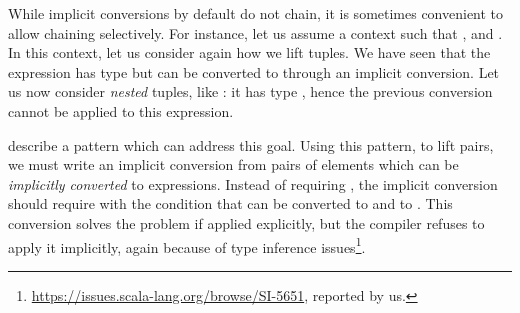 


While implicit conversions by default do not chain, it is sometimes convenient to allow chaining selectively.
For instance, let us assume a context such that ,  and .
In this context, let us consider again how we lift tuples. We have seen that the expression  has type  but can be converted to  through an implicit conversion. Let us now consider \emph{nested} tuples, like : it has type , hence the previous conversion cannot be applied to this expression.

\citet[Ch.~21]{Odersky11book} describe a pattern which can address this goal. Using this pattern, to lift pairs, we must write an implicit conversion from pairs of elements which can be \emph{implicitly converted} to expressions. Instead of requiring
, the implicit conversion should require  with the condition that  can be converted to  and  to . This conversion solves the problem if applied explicitly,
but the compiler refuses to apply it implicitly, again because of type inference issues\footnote{\url{https://issues.scala-lang.org/browse/SI-5651}, reported by us.}.

